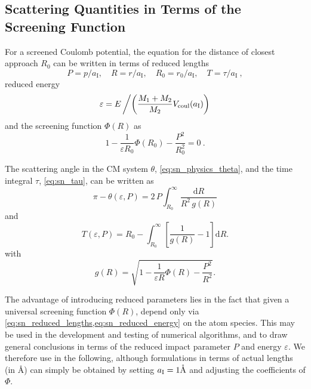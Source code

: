 \subsection{Scattering Quantities in Terms of the Screening Function}
%
For a screened Coulomb potential, the equation for the distance of closest approach $R_0$ can be written in terms of reduced lengths
%
\begin{equation}
    \label{eq:sn_reduced_lengths}
    P = p/a_\mathrm{I}, \quad R = r/a_\mathrm{I}, \quad R_0 = r_0/a_\mathrm{I}, \quad T = \tau/a_\mathrm{I} ~,
\end{equation}
%
reduced energy
%
\begin{equation}
    \label{eq:sn_reduced_energy}
    \varepsilon = E \left/ \left( \frac{ M_1 + M_2 }{ M_2 }
    V_\mathrm{coul}(a_\mathrm{I}) \right) \right.
\end{equation}
%
and the screening function $\Phi(R)$ as
%
\begin{equation}
    \label{eq:sn_apsis}
    1 - \frac{ 1 }{ \varepsilon R_0 } \Phi(R_0) - \frac{ P^2 }{ R_0^2 } = 0 ~.
\end{equation}

The scattering angle in the CM system $\theta$, \cref{eq:sn_physics_theta}, and the time integral $\tau$, \cref{eq:sn_tau}, can be written as
%
\begin{equation}
    \label{eq:sn_reduced_theta}
    \pi - \theta(\varepsilon,P) = 2 \, P \int_{R_0}^\infty
        \frac{ \mathrm{d}R }{ R^2 \, g(R) }
\end{equation}
%
and
%
\begin{equation}
    \label{eq:sn_reduced_tau}
    T(\varepsilon,P) = R_0 - \int_{R_0}^\infty \left[
    \frac{ 1 }{ g(R) } - 1 \right] \mathrm{d}R.
\end{equation}
%
with
%
\begin{equation}
    \label{eq:sn_reduced_g}
    g(R) = \sqrt{ 1 - \frac{ 1 }{ \varepsilon R } \Phi(R)
        - \frac{ P^2 }{ R^2 } } .
\end{equation}

The advantage of introducing reduced parameters lies in the fact that given a universal screening function $\Phi(R)$,  depend only via \cref{eq:sn_reduced_lengths,eq:sn_reduced_energy} on the atom species.
This may be used in the development and testing of numerical algorithms, and to draw general conclusions in terms of the reduced impact parameter $P$ and energy $\varepsilon$.
We therefore use  in the following, although formulations in terms of actual lengths (in \AA) can simply be obtained by setting $a_\mathrm{I} = 1 \mathring{\mathrm{A}}$ and adjusting the coefficients of $\Phi$.
